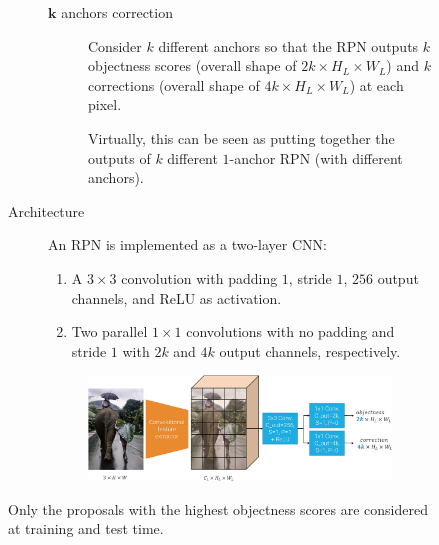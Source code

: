 \begin{description}
\begin{description}
\begin{description}
\begin{description}
                    \item[$\mathbf{k}$ anchors correction] 
                        Consider $k$ different anchors so that the RPN outputs $k$ objectness scores (overall shape of $2k \times H_L \times W_L$) and $k$ corrections (overall shape of $4k \times H_L \times W_L$) at each pixel.

                        \begin{remark}
                            Virtually, this can be seen as putting together the outputs of $k$ different $1$-anchor RPN (with different anchors).
                        \end{remark}
                \end{description}

                \item[Architecture]
                    An RPN is implemented as a two-layer CNN:
                    \begin{enumerate}
                        \item A $3 \times 3$ convolution with padding $1$, stride $1$, $256$ output channels, and ReLU as activation.
                        \item Two parallel $1 \times 1$ convolutions with no padding and stride $1$ with $2k$ and $4k$ output channels, respectively.
                    \end{enumerate}
                    \begin{figure}[H]
                        \raggedleft
                        \includegraphics[width=0.7\linewidth]{./img/_rpn_architecture.jpg}
                    \end{figure}
            \end{description}

            \begin{remark}
                Only the proposals with the highest objectness scores are considered at training and test time.
            \end{remark}


\end{description}
\end{description}

